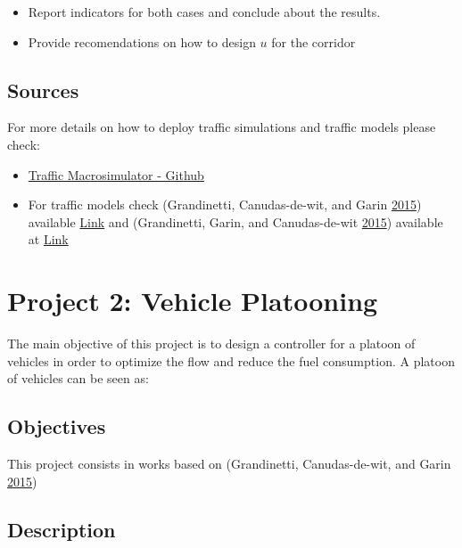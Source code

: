 \documentclass[]{book}
\theoremstyle{definition}
\theoremstyle{definition}
\theoremstyle{definition}
\theoremstyle{remark}
\begin{document}
\begin{itemize}
\item
  Report indicators for both cases and conclude about the results.
\item
  Provide recomendations on how to design \(u\) for the corridor
\end{itemize}

\hypertarget{sources}{%
\section*{Sources}\label{sources}}

For more details on how to deploy traffic simulations and traffic models
please check:

\begin{itemize}
\item
  \href{https://github.com/andres-ladino-ifsttar/traffic-macrosimulator}{Traffic
  Macrosimulator - Github}
\item
  For traffic models check (Grandinetti, Canudas-de-wit, and Garin
  \protect\hyperlink{ref-Grandinetti2015}{2015}) available
  \href{https://hal.archives-ouvertes.fr/hal-01188535}{Link} and
  (Grandinetti, Garin, and Canudas-de-wit
  \protect\hyperlink{ref-Grandinetti2016}{2015}) available at
  \href{https://hal.archives-ouvertes.fr/hal-01188811}{Link}
\end{itemize}

\hypertarget{project-2-vehicle-platooning}{%
\chapter{Project 2: Vehicle
Platooning}\label{project-2-vehicle-platooning}}

The main objective of this project is to design a controller for a
platoon of vehicles in order to optimize the flow and reduce the fuel
consumption. A platoon of vehicles can be seen as:

\hypertarget{objectives-1}{%
\section*{Objectives}\label{objectives-1}}

This project consists in works based on (Grandinetti, Canudas-de-wit,
and Garin \protect\hyperlink{ref-Grandinetti2015}{2015})

\hypertarget{description-1}{%
\section*{Description}\label{description-1}}
\end{document}
